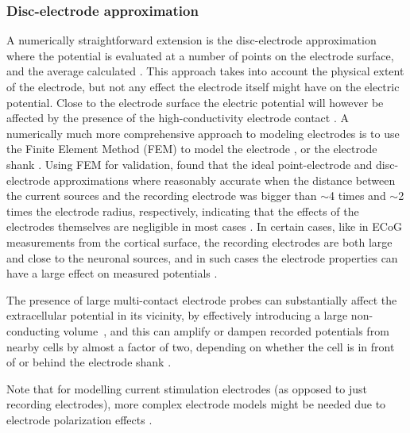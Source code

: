 \subsubsection{Disc-electrode approximation}
A numerically straightforward extension is the disc-electrode approximation where the potential is evaluated at a number of points on the electrode surface, and the average calculated \citep{ Linden2014}. This approach takes into account the physical extent of the electrode, but not any effect the electrode itself might have on the electric potential. Close to the electrode surface the electric potential will however be affected by the presence of the high-conductivity electrode contact \citep{McIntyre2001, Moulin2008}. A numerically much more comprehensive approach to modeling electrodes is to use the Finite Element Method (FEM) to model the electrode \citep{Moulin2008, Ness2015}, or the electrode shank \citep{Moffitt2005, Buccino2019b}. Using FEM for validation, \citep{Ness2015} found that the ideal point-electrode and disc-electrode approximations where reasonably accurate when the distance between the current sources and the recording electrode was bigger than $\sim$4 times and $\sim$2 times the electrode radius, respectively, indicating that the effects of the electrodes themselves are negligible in most cases \citep{Nelson2010}. In certain cases, like in ECoG measurements from the cortical surface, the recording electrodes are both large and close to the neuronal sources, and in such cases the electrode properties can have a large effect on measured potentials \citep{Vermaas2020, Rogers2020}.

The presence of large multi-contact electrode probes can substantially affect the extracellular potential in its vicinity, by effectively introducing a large non-conducting volume~\citep{Mechler2012}, and this can amplify or dampen recorded potentials from nearby cells by almost a factor of two, depending on whether the cell is in front of or behind the electrode shank \citep{Buccino2019b}.

Note that for modelling current stimulation electrodes (as opposed to just recording electrodes), more complex electrode models might be needed due to electrode polarization effects \citep{McIntyre2001, Martinsen2008, Joucla2012}.




